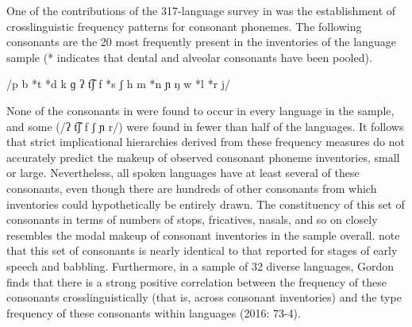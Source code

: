   One of the contributions of the 317-language survey in \citet{Maddieson1984} was the establishment of crosslinguistic frequency patterns for consonant phonemes. The following consonants are the 20 most frequently present in the inventories of the language sample (* indicates that dental and alveolar consonants have been pooled).

\ea\label{ex:4.1}
  /p b *t *d k ɡ ʔ t͡ʃ f *s ʃ h m *n ɲ ŋ w *l *r j/
\citep[12]{Maddieson1984}
\z

None of the consonants in  were found to occur in every language in the sample, and some (/ʔ t͡ʃ f ʃ ɲ r/) were found in fewer than half of the languages. It follows that strict implicational hierarchies derived from these frequency measures do not accurately predict the makeup of observed consonant phoneme inventories, small or large. Nevertheless, all spoken languages have at least several of these consonants, even though there are hundreds of other consonants from which inventories could hypothetically be entirely drawn. The constituency of this set of consonants in terms of numbers of stops, fricatives, nasals, and so on closely resembles the modal makeup of consonant inventories in the sample overall. \citet{LindblomMaddieson1988} note that this set of consonants is nearly identical to that reported for stages of early speech and babbling. Furthermore, in a sample of 32 diverse languages, Gordon finds that there is a strong positive correlation between the frequency of these consonants crosslinguistically (that is, across consonant inventories) and the type frequency of these consonants within languages (2016: 73-4).

